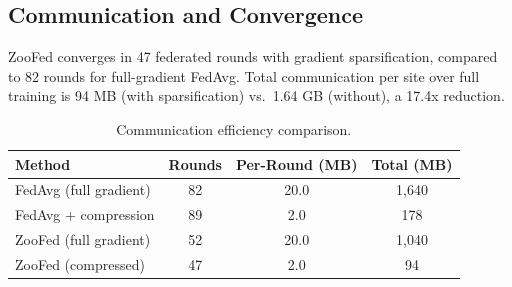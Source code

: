 \subsection{Communication and Convergence}

ZooFed converges in 47 federated rounds with gradient sparsification, compared to 82 rounds for full-gradient FedAvg.
Total communication per site over full training is 94 MB (with sparsification) vs.\ 1.64 GB (without), a 17.4x reduction.

\begin{table}[H]
\centering
\caption{Communication efficiency comparison.}
\label{tab:communication}
\begin{tabular}{@{}lccc@{}}
\toprule
\textbf{Method} & \textbf{Rounds} & \textbf{Per-Round (MB)} & \textbf{Total (MB)} \\
\midrule
FedAvg (full gradient) & 82 & 20.0 & 1,640 \\
FedAvg + compression & 89 & 2.0 & 178 \\
ZooFed (full gradient) & 52 & 20.0 & 1,040 \\
ZooFed (compressed) & 47 & 2.0 & 94 \\
\bottomrule
\end{tabular}
\end{table}

